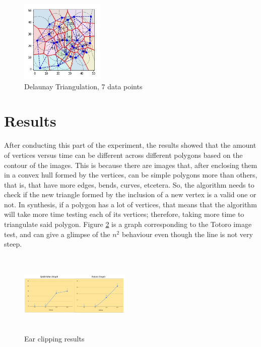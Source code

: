 \documentclass[conference]{IEEEtran}
\begin{document}
\begin{figure}[H]
    \centering
    \includegraphics[width=150,height=150,keepaspectratio]{delaunay25.jpg}
    \caption{Delaunay Triangulation, 7 data points}
    \label{fig:Delaunay2}
\end{figure}


\section{Results}


After conducting this part of the experiment, the results showed that the amount of vertices versus time can be different across different polygons based on the contour of the images. This is because there are images that, after enclosing them in a convex hull formed by the vertices, can be simple polygons more than others, that is, that have more edges, bends, curves, etcetera. So, the algorithm needs to check if the new triangle formed by the inclusion of a new vertex is a valid one or not. In synthesis, if a polygon has a lot of vertices, that means that the algorithm will take more time testing each of its vertices; therefore, taking more time to triangulate said polygon. Figure \ref{fig:Result1} is a graph corresponding to the Totoro image test, and can give a glimpse of the $n^2$ behaviour even though the line is not very steep.\\

\begin{figure}[H]
    \centering
    \includegraphics[width=200,height=150,keepaspectratio]{Graphs.png}
    \caption{Ear clipping results}
    \label{fig:Result1}
\end{figure}
\end{document}
